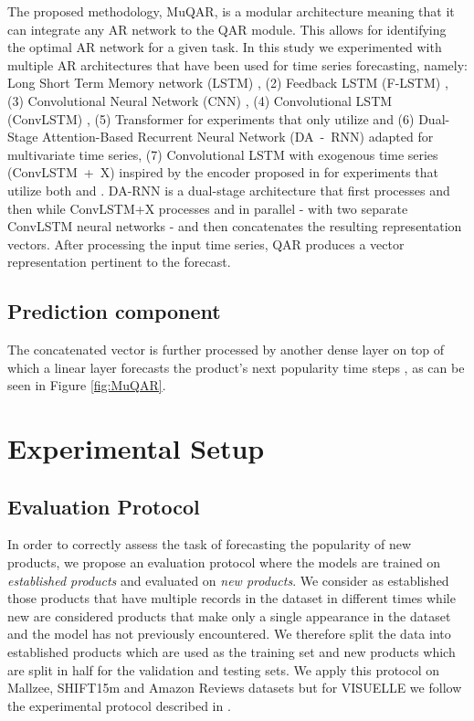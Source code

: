 \documentclass{article}
\begin{document}
The proposed methodology, MuQAR, is a modular architecture meaning that it can integrate any AR network to the QAR module. This allows for identifying the optimal AR network for a given task. In this study we experimented with multiple AR architectures that have been used for time series forecasting, namely: 
 Long Short Term Memory network (LSTM) \cite{hochreiter1997long}, 
 (2) Feedback LSTM (F-LSTM) \cite{graves2013generating}, (3) Convolutional Neural Network (CNN) \cite{zhao2017convolutional}, (4) Convolutional LSTM (ConvLSTM) \cite{xingjian2015convolutional}, (5) Transformer \cite{vaswani2017attention} 
for experiments that only utilize  
and (6) Dual-Stage Attention-Based Recurrent Neural Network (DA~-~RNN) \cite{qin2017dual} adapted for multivariate time series, (7) Convolutional LSTM with exogenous time series (ConvLSTM~+~X) inspired by the encoder proposed in \cite{chang2018memory} for experiments that utilize both   and . 
DA-RNN is a dual-stage architecture that first processes  and then  while ConvLSTM+X processes  and  in parallel - with two separate ConvLSTM neural networks - and then concatenates the resulting representation vectors.
After processing the input time series, QAR produces a vector representation  pertinent to the forecast.

\subsection{Prediction component}
The concatenated vector  is further processed by another dense layer on top of which a linear layer forecasts the product's next  popularity time steps , as can be seen in Figure \ref{fig:MuQAR}. 

\section{Experimental Setup}
\label{section:experimental_setup}
\subsection{Evaluation Protocol}
\label{section:evaluation}
In order to correctly assess the task of forecasting the popularity of new products, we propose an evaluation protocol where the models are trained on \textit{established products} and evaluated on \textit{new products}. We consider as established those products that have multiple records in the dataset in different times while new are considered products that make only a single appearance in the dataset and the model has not previously encountered. We therefore split the data into established products which are used as the training set and new products which are split in half for the validation and testing sets. We apply this protocol on Mallzee, SHIFT15m and Amazon Reviews datasets but for VISUELLE we follow the experimental protocol described in \cite{skenderi2021well}. 
\end{document}
